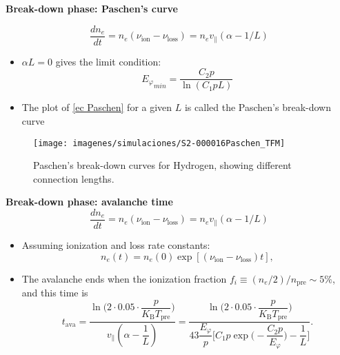 \documentclass[10pt]{beamer}
\begin{document}
\begin{frame}{\bf Break-down phase: Paschen's curve}
	\begin{minipage}{0.45\textwidth}
		\begin{equation} \nonumber
\dfrac{d n_e}{dt}=n_e(\nu_\text{ion}-\nu_\text{loss})=n_e v_{\parallel}(\alpha-1/L)
		\end{equation}
		\begin{itemize}
			\item $ \alpha L=0$ gives the limit condition:
			\begin{equation}\label{ec Paschen}
{E_\varphi}_{min}=\dfrac{C_2 p}{\ln(C_1 p L)}
			\end{equation}		
			\item The plot of \eqref{ec Paschen} for a  given $L$ is called the Paschen's break-down curve	
		\end{itemize}
	\end{minipage}
	\hfill
	\begin{minipage}{0.45\textwidth}
		\begin{figure}
		\centering
		\texttt{[image: imagenes/simulaciones/S2-000016Paschen\_TFM]}

		\caption{Paschen's break-down curves for Hydrogen, showing different connection lengths.}
		\end{figure}
	\end{minipage}
\end{frame}


\begin{frame}{\bf Break-down phase: avalanche time}
		\begin{equation} \nonumber
\dfrac{d n_e}{dt}=n_e(\nu_\text{ion}-\nu_\text{loss})=n_e v_{\parallel}(\alpha-1/L)
		\end{equation}
		\begin{itemize}
			\item Assuming ionization and loss rate constants:
			\begin{equation}\label{ec ne}
n_e(t)=n_e(0)\exp{ [(\nu_\text{ion}-\nu_\text{loss})t]},
			\end{equation}	
			\item The avalanche ends when the ionization fraction $f_i \equiv (n_e/2)/n_\text{pre} \sim 5\%$, and this time is
			\begin{equation}\label{ec t_ava}
t_\text{ava}= \dfrac{\ln \Big(2\cdot 0.05 \cdot \dfrac{p}{K_\text{B} T_\text{pre}} \Big) }{v_\parallel (\alpha-\dfrac{1}{L})}=\dfrac{\ln \Big(2\cdot 0.05 \cdot \dfrac{p}{K_\text{B} T_\text{pre}} \Big) }{43 \dfrac{E_\varphi}{p}\Big[ C_1 p \exp \Big(-\dfrac{C_2 p}{E_\varphi} \Big)-\dfrac{1}{L} \Big]}.
\end{equation}	
		\end{itemize}

\end{frame}
\end{document}
